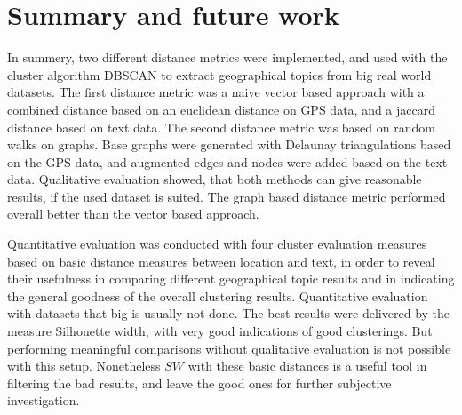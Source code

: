 \chapter{Summary and future work}\label{chap:future}


In summery, two different distance metrics were implemented, and used with the cluster algorithm DBSCAN to extract geographical topics from big real world datasets. The first distance metric was a naive vector based approach with a combined distance based on an euclidean distance on GPS data, and a jaccard distance based on text data. The second distance metric was based on random walks on graphs. Base graphs were generated with Delaunay triangulations based on the GPS data, and augmented edges and nodes were added based on the text data. Qualitative evaluation showed, that both methods can give reasonable results, if the used dataset is suited. The graph based distance metric performed overall better than the vector based approach.

Quantitative evaluation was conducted with four cluster evaluation measures based on basic distance measures between location and text, in order to reveal their usefulness in comparing different geographical topic results and in indicating the general goodness of the overall clustering results. Quantitative evaluation with datasets that big is usually not done. The best results were delivered by the measure Silhouette width, with very good indications of good clusterings. But performing meaningful comparisons without qualitative evaluation is not possible with this setup. Nonetheless $SW$ with these basic distances is a useful tool in filtering the bad results, and leave the good ones for further subjective investigation.

